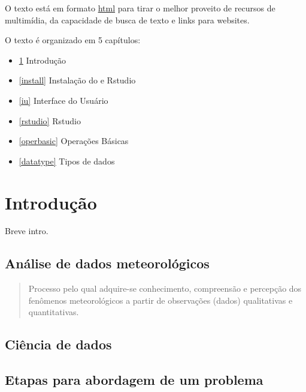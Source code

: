 \documentclass[]{book}
\begin{document}
O texto está em formato \href{https://pt.wikipedia.org/wiki/HTML}{html}
para tirar o melhor proveito de recursos de multimídia, da capacidade de
busca de texto e links para websites.

O texto é organizado em 5 capítulos:

\begin{itemize}
\item
  \ref{intro} Introdução
\item
  \ref{install} Instalação do e Rstudio
\item
  \ref{iu} Interface do Usuário
\item
  \ref{rstudio} Rstudio
\item
  \ref{operbasic} Operações Básicas
\item
  \ref{datatype} Tipos de dados
\end{itemize}

\chapter{Introdução}\label{intro}

Breve intro.

\section{Análise de dados
meteorológicos}\label{analise-de-dados-meteorologicos}

\begin{quote}
Processo pelo qual adquire-se conhecimento, compreensão e percepção dos
fenômenos meteorológicos a partir de observações (dados) qualitativas e
quantitativas.
\end{quote}

\section{Ciência de dados}\label{ciencia-de-dados}

\section{Etapas para abordagem de um
problema}\label{etapas-para-abordagem-de-um-problema}
\end{document}
